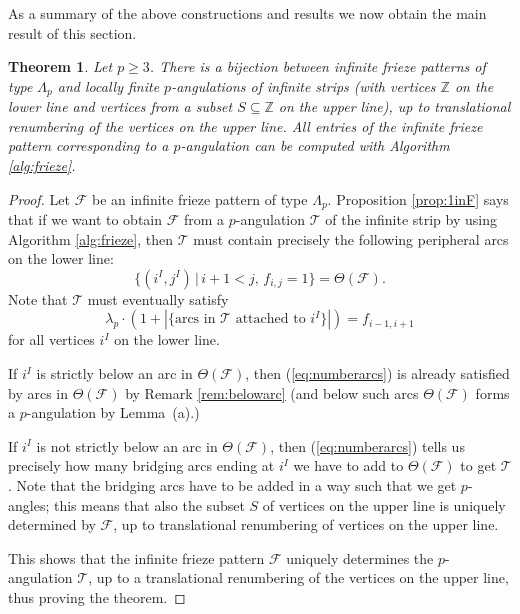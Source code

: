 \documentclass[11pt,a4paper]{amsart}
\newtheorem{Theorem}[Lemma]{Theorem}
\theoremstyle{definition}
\numberwithin{equation}{section}
\begin{document}
As a summary of the above constructions and results we now obtain the main result of this section. 

\begin{Theorem} \label{thm:bijection}
Let $p\ge 3$. There is a bijection between infinite frieze patterns of type $\Lambda_p$ and
locally finite 
$p$-angulations of infinite strips (with vertices $\mathbb{Z}$ on the lower line and vertices
from a subset $S\subseteq \mathbb{Z}$ on the upper line), up to translational renumbering 
of the vertices on the upper line. All entries of the infinite frieze pattern corresponding to a
$p$-angulation can be computed with Algorithm \ref{alg:frieze}. 
\end{Theorem}

\begin{proof}
Let $\mathcal{F}$ be an infinite frieze pattern of type $\Lambda_p$. Proposition \ref{prop:1inF} says that 
if we want to obtain $\mathcal{F}$ from a $p$-angulation $\mathcal{T}$
of the infinite strip by using Algorithm \ref{alg:frieze}, then $\mathcal{T}$ must contain precisely the 
following peripheral arcs on the lower line: 
$$\{ (i^I,j^I)\,|\,i+1<j,\,f_{i,j}=1\} = \Theta(\mathcal{F}).
$$
Note that $\mathcal{T}$ must eventually satisfy 
\begin{equation} \label{eq:numberarcs}
\lambda_p\cdot (1+|\{\mbox{arcs in $\mathcal{T}$ attached to $i^I$}\}|) = f_{i-1,i+1}
\end{equation}
for all vertices $i^I$ on the lower line. 

If $i^I$ is strictly below an arc in $\Theta(\mathcal{F})$, then (\ref{eq:numberarcs}) is already satisfied
by arcs in $\Theta(\mathcal{F})$ by Remark \ref{rem:belowarc} (and below such arcs $\Theta(\mathcal{F})$
forms a $p$-angulation by Lemma \,(a).)

If $i^I$ is not strictly below an arc in $\Theta(\mathcal{F})$, then (\ref{eq:numberarcs}) tells us
precisely how many bridging arcs ending at $i^I$ we have to add to $\Theta(\mathcal{F})$ to
get $\mathcal{T}$. Note that the bridging arcs have to be added in a way such that we get $p$-angles;
this means that also the subset $S$ of vertices on the upper line is uniquely determined by $\mathcal{F}$,
up to translational renumbering of vertices on the upper line. 

This shows that the infinite frieze pattern $\mathcal{F}$ uniquely determines the $p$-angulation $\mathcal{T}$, 
up to a translational renumbering of the vertices on the upper line, thus proving the theorem.
\end{proof}
\end{document}
